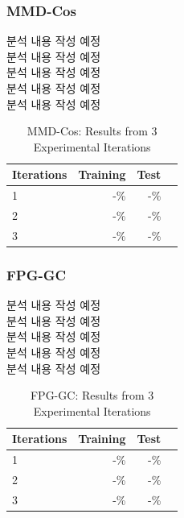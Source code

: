 \subsubsection{MMD-Cos}
분석 내용 작성 예정\\
분석 내용 작성 예정\\
분석 내용 작성 예정\\
분석 내용 작성 예정\\
분석 내용 작성 예정\\
\begin{table}[h]
  \centering
  \begin{tabular}{lrrr}
  \toprule
  Iterations & Training & Test \\
  \midrule
  1 & -\% & -\% \\
  2 & -\% & -\% \\
  3 & -\% & -\% \\
  \bottomrule
  \end{tabular}
  \caption{MMD-Cos: Results from 3 Experimental Iterations}
  \label{tab:MMD-Cos: Results from 3 Experimental Iterations}
\end{table}

\subsubsection{FPG-GC}
분석 내용 작성 예정\\
분석 내용 작성 예정\\
분석 내용 작성 예정\\
분석 내용 작성 예정\\
분석 내용 작성 예정\\
\begin{table}[h]
  \centering
  \begin{tabular}{lrrr}
  \toprule
  Iterations & Training & Test \\
  \midrule
  1 & -\% & -\% \\
  2 & -\% & -\% \\
  3 & -\% & -\% \\
  \bottomrule
  \end{tabular}
  \caption{FPG-GC: Results from 3 Experimental Iterations}
  \label{tab:FPG-GC: Results from 3 Experimental Iterations}
\end{table}


